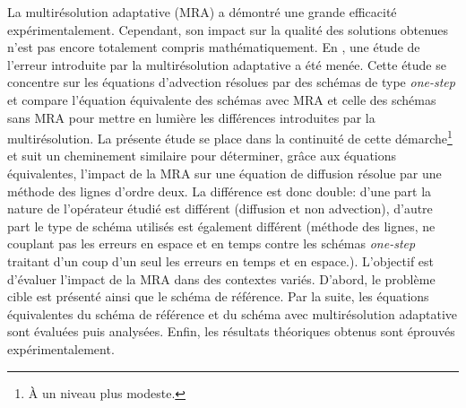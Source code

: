 La multirésolution adaptative (MRA) a démontré une grande efficacité expérimentalement.
Cependant, son impact sur la qualité des solutions obtenues n'est pas encore totalement compris mathématiquement.
En \cite{belloti_et_al_2025}, une étude de l'erreur introduite par la multirésolution adaptative a été menée.
Cette étude se concentre sur les équations d'advection résolues par des schémas de type \textit{one-step} \cite{DARU2004563} et
compare l'équation équivalente des schémas avec MRA et celle des schémas sans MRA pour mettre en lumière les différences introduites par la multirésolution.
La présente étude se place dans la continuité de cette démarche\footnote{À un niveau plus modeste.} et suit un cheminement similaire
pour déterminer, grâce aux équations équivalentes, l'impact de la MRA sur une équation de diffusion résolue par une méthode des lignes d'ordre deux.
La différence est donc double: d'une part la nature de l'opérateur étudié est différent (diffusion et non advection), d'autre part le type de schéma 
utilisés est également différent (méthode des lignes, ne couplant pas les erreurs en espace et en temps contre les schémas \textit{one-step} 
traitant d'un coup d'un seul les erreurs en temps et en espace.). L'objectif est d'évaluer l'impact de la MRA dans des contextes variés.
D'abord, le problème cible est présenté ainsi que le schéma de référence.
Par la suite, les équations équivalentes du schéma de référence et du schéma avec multirésolution adaptative sont évaluées puis analysées.
Enfin, les résultats théoriques obtenus sont éprouvés expérimentalement.